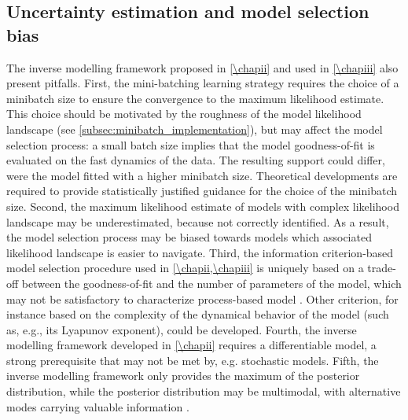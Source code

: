 \subsection{Uncertainty estimation and model selection bias}
The inverse modelling framework proposed in \cref{\chapii} and used in \cref{\chapiii} also present pitfalls.
%
First, the mini-batching learning strategy requires the choice of a minibatch size to ensure the convergence to the maximum likelihood estimate. This choice should be motivated by the roughness of the model likelihood landscape (see \cref{subsec:minibatch_implementation}), but may affect the model selection process:
a small batch size implies that the model goodness-of-fit is evaluated on the fast dynamics of the data. The resulting support could differ, were the model fitted with a higher minibatch size. Theoretical developments are required to provide statistically justified guidance for the choice of the minibatch size. 
% 
Second, the maximum likelihood estimate of models with complex likelihood landscape may be underestimated, because not correctly identified. As a result, the model selection process may be biased towards models which associated likelihood landscape is easier to navigate. 
% 
Third, the information criterion-based model selection procedure used in \cref{\chapii,\chapiii} is uniquely based on a trade-off between the goodness-of-fit and the number of parameters of the model, which may not be satisfactory to characterize process-based model \citep{Clermont2015}. 
% 
Other criterion, for instance based on the complexity of the dynamical behavior of the model (such as, e.g., its Lyapunov exponent), could be developed.
% 
Fourth, the inverse modelling framework developed in \cref{\chapii} requires a differentiable model, a strong prerequisite that may not be met by, e.g. stochastic models. 
% 
Fifth, the inverse modelling framework only provides the maximum of the posterior distribution, while the posterior distribution may be multimodal, with alternative modes carrying valuable information \citep{Wilson2020}.%

